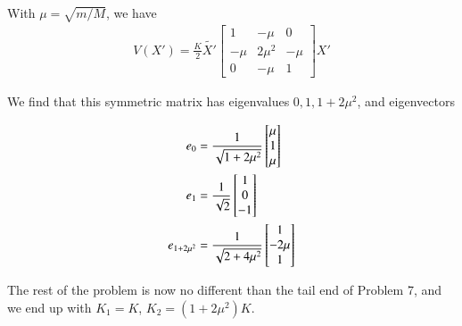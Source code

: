 With $\mu = \sqrt{m/M}$, we have
\begin{align}\label{eqn:desaiCh9:802}
V(X') = \frac{K}{2} 
\tilde{X'}
\begin{bmatrix}
1 & -\mu & 0 \\
-\mu & 2 \mu^2 & -\mu \\
0 & -\mu & 1
\end{bmatrix}
X'
\end{align}

We find that this symmetric matrix has eigenvalues $0, 1, 1 + 2 \mu^2$, and eigenvectors

\begin{align}\label{eqn:desaiCh9:803}
e_0 &=
\frac{1}{\sqrt{1 + 2 \mu^2}}
\begin{bmatrix}
\mu \\ 1 \\ \mu
\end{bmatrix} \\
e_1 &=
\frac{1}{\sqrt{2}}
\begin{bmatrix}
1 \\ 0 \\ -1
\end{bmatrix} \\
e_{1+ 2 \mu^2} &=
\frac{1}{\sqrt{2 + 4 \mu^2}}
\begin{bmatrix}
1 \\ -2 \mu \\ 1
\end{bmatrix} 
\end{align}

The rest of the problem is now no different than the tail end of Problem 7, and we end up with $K_1 = K$, $K_2 = (1 + 2 \mu^2) K$.

\EndArticle
